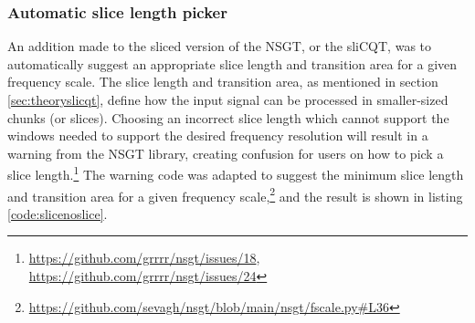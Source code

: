 \documentclass[report.tex]{subfiles}
\begin{document}
\subsubsection{Automatic slice length picker}
\label{sec:autosllen}

An addition made to the sliced version of the NSGT, or the sliCQT, was to automatically suggest an appropriate slice length and transition area for a given frequency scale. The slice length and transition area, as mentioned in section \ref{sec:theoryslicqt}, define how the input signal can be processed in smaller-sized chunks (or slices). Choosing an incorrect slice length which cannot support the windows needed to support the desired frequency resolution will result in a warning from the NSGT library, creating confusion for users on how to pick a slice length.\footnote{\url{https://github.com/grrrr/nsgt/issues/18}, \url{https://github.com/grrrr/nsgt/issues/24}} The warning code was adapted to suggest the minimum slice length and transition area for a given frequency scale,\footnote{\url{https://github.com/sevagh/nsgt/blob/main/nsgt/fscale.py\#L36}} and the result is shown in listing \ref{code:slicenoslice}.
\end{document}
